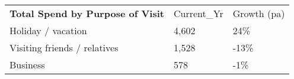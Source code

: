 \begin{tabular}[t]{p{5.4cm}p{0.9cm}p{1.2cm}}
 \textbf{Total Spend by Purpose of Visit} & Current\_Yr & Growth (pa) \\ 
 Holiday / vacation & 4,602 & 24\% \\ 
  Visiting friends / relatives & 1,528 & -13\% \\ 
  Business &   578 & -1\% \\ 
  \end{tabular}
